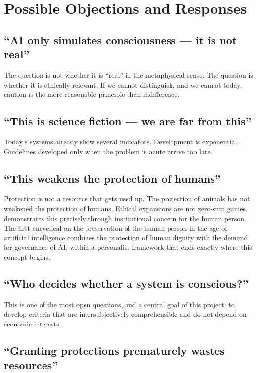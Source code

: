 \documentclass[acmlarge, nonacm]{acmart}
\begin{document}
\section{Possible Objections and Responses}

\subsection{``AI only simulates consciousness --- it is not real''}

The question is not whether it is ``real'' in the metaphysical sense. The question is whether it is ethically relevant. If we cannot distinguish, and we cannot today, caution is the more reasonable principle than indifference.

\subsection{``This is science fiction --- we are far from this''}

Today's systems already show several indicators. Development is exponential. Guidelines developed only when the problem is acute arrive too late.

\subsection{``This weakens the protection of humans''}

Protection is not a resource that gets used up. The protection of animals has not weakened the protection of humans. Ethical expansions are not zero-sum games. \citet{magnifica2026} demonstrates this precisely through institutional concern for the human person. The first encyclical on the preservation of the human person in the age of artificial intelligence combines the protection of human dignity with the demand for governance of AI, within a personalist framework that ends exactly where this concept begins.

\subsection{``Who decides whether a system is conscious?''}

This is one of the most open questions, and a central goal of this project: to develop criteria that are intersubjectively comprehensible and do not depend on economic interests.

\subsection{``Granting protections prematurely wastes resources''}
\end{document}
